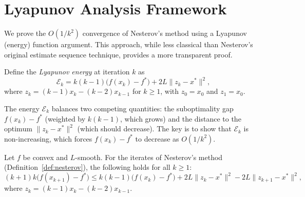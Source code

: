\documentclass[11pt,a4paper]{article}
\begin{document}

\section{Lyapunov Analysis Framework}\label{sec:lyapunov}

We prove the $O(1/k^2)$ convergence of Nesterov's method using a
Lyapunov (energy) function argument. This approach, while less classical
than Nesterov's original estimate sequence technique, provides a more
transparent proof.

\begin{definition}\label{def:lyapunov}
Define the \emph{Lyapunov energy} at iteration $k$ as
\begin{equation}\label{eq:lyapunov}
  \mathcal{E}_k = k(k-1)\bigl(f(x_k) - f^*\bigr)
  + 2L\|z_k - x^*\|^2,
\end{equation}
where $z_k = (k-1)x_k - (k-2)x_{k-1}$ for $k \ge 1$, with
$z_0 = x_0$ and $z_1 = x_0$.
\end{definition}

\begin{remark}\label{rem:lyapunov-role}
The energy $\mathcal{E}_k$ balances two competing quantities: the
suboptimality gap $f(x_k) - f^*$ (weighted by $k(k-1)$, which grows)
and the distance to the optimum $\|z_k - x^*\|^2$ (which should
decrease). The key is to show that $\mathcal{E}_k$ is non-increasing,
which forces $f(x_k) - f^*$ to decrease as $O(1/k^2)$.
\end{remark}

\begin{lemma}\label{lem:key-descent}
Let $f$ be convex and $L$-smooth. For the iterates of Nesterov's
method (Definition~\ref{def:nesterov}), the following holds for all
$k \ge 1$:
\begin{equation}\label{eq:key-descent}
  (k+1)k\bigl(f(x_{k+1}) - f^*\bigr)
  \le k(k-1)\bigl(f(x_k) - f^*\bigr)
  + 2L\|z_k - x^*\|^2 - 2L\|z_{k+1} - x^*\|^2,
\end{equation}
where $z_k = (k-1)x_k - (k-2)x_{k-1}$.
\end{lemma}
\end{document}

